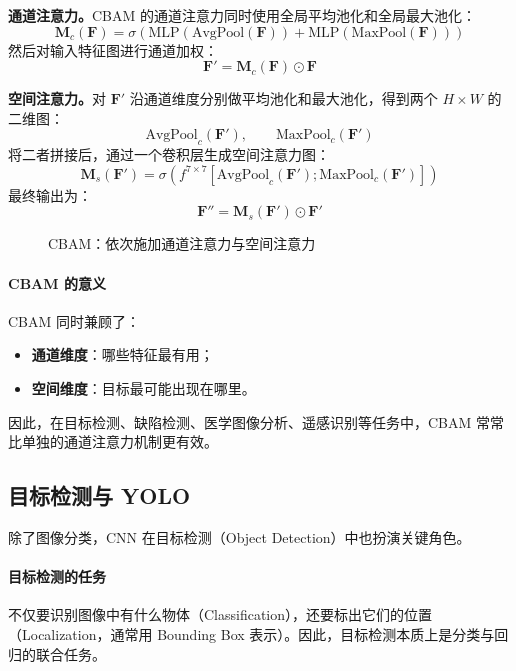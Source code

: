 \textbf{通道注意力。}CBAM 的通道注意力同时使用全局平均池化和全局最大池化：
\begin{equation}
\mathbf{M}_c(\mathbf{F})
=
\sigma\left(
\text{MLP}(\text{AvgPool}(\mathbf{F}))
+
\text{MLP}(\text{MaxPool}(\mathbf{F}))
\right)
\end{equation}
然后对输入特征图进行通道加权：
\begin{equation}
\mathbf{F}' = \mathbf{M}_c(\mathbf{F}) \odot \mathbf{F}
\end{equation}

\textbf{空间注意力。}对 $\mathbf{F}'$ 沿通道维度分别做平均池化和最大池化，得到两个 $H\times W$ 的二维图：
\[
\text{AvgPool}_c(\mathbf{F}'),\qquad \text{MaxPool}_c(\mathbf{F}')
\]
将二者拼接后，通过一个卷积层生成空间注意力图：
\begin{equation}
\mathbf{M}_s(\mathbf{F}')
=
\sigma\left(
f^{7\times7}
\left[
\text{AvgPool}_c(\mathbf{F}');
\text{MaxPool}_c(\mathbf{F}')
\right]
\right)
\end{equation}
最终输出为：
\begin{equation}
\mathbf{F}'' = \mathbf{M}_s(\mathbf{F}') \odot \mathbf{F}'
\end{equation}

\begin{figure}[H]
  \centering
  \resizebox{\textwidth}{!}{}
  \caption{CBAM：依次施加通道注意力与空间注意力}
  \label{fig:ch09_orig14}
\end{figure}

\paragraph{CBAM 的意义}
CBAM 同时兼顾了：
\begin{itemize}
    \item \textbf{通道维度}：哪些特征最有用；
    \item \textbf{空间维度}：目标最可能出现在哪里。
\end{itemize}
因此，在目标检测、缺陷检测、医学图像分析、遥感识别等任务中，CBAM 常常比单独的通道注意力机制更有效。

\subsection{目标检测与 YOLO}

除了图像分类，CNN 在目标检测（Object Detection）中也扮演关键角色。

\paragraph{目标检测的任务}
不仅要识别图像中有什么物体（Classification），还要标出它们的位置（Localization，通常用 Bounding Box 表示）。因此，目标检测本质上是分类与回归的联合任务。

